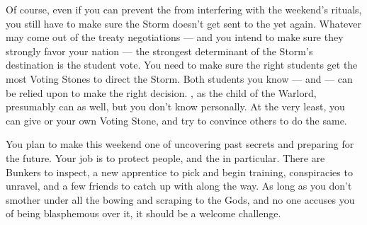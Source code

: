 \documentclass[char]{GL2020}
\begin{document}
Of course, even if you can prevent the \pGoaties{} from interfering with the weekend's rituals, you still have to make sure the Storm doesn't get sent to the \pShip{} yet again. Whatever may come out of the treaty negotiations — and you intend to make sure they strongly favor your nation — the strongest determinant of the Storm’s destination is the student vote. You need to make sure the right students get the most Voting Stones to direct the Storm. Both \pShippie{} students you know — \cPresident{} and \cInitiate{} — can be relied upon to make the right decision. \cWarlordDaughter{\full}, as the child of the Warlord, presumably can as well, but you don’t know \cWarlordDaughter{\them} personally. At the very least, you can give \cPresident{} or \cInitiate{} your own Voting Stone, and try to convince others to do the same.

You plan to make this weekend one of uncovering past secrets and preparing for the future. Your job is to protect people, and the \pShippies{} in particular. There are Bunkers to inspect, a new apprentice to pick and begin training, conspiracies to unravel, and a few friends to catch up with along the way. As long as you don't smother under all the bowing and scraping to the Gods, and no one accuses you of being blasphemous over it, it should be a welcome challenge.
\end{document}
